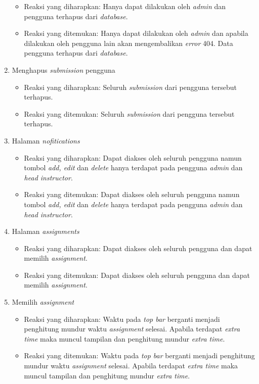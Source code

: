 \begin{enumerate}
	 \begin{itemize}
	 	\item Reaksi yang diharapkan: Hanya dapat dilakukan oleh \textit{admin} dan pengguna terhapus dari \textit{database}.
	 	\item Reaksi yang ditemukan: Hanya dapat dilakukan oleh \textit{admin} dan apabila dilakukan oleh pengguna lain akan mengembalikan \textit{error} 404. Data pengguna terhapus dari \textit{database}.
	 \end{itemize}
	 \item Menghapus \textit{submission} pengguna
	 \begin{itemize}
	 	\item Reaksi yang diharapkan: Seluruh \textit{submission} dari pengguna tersebut terhapus.
	 	\item Reaksi yang ditemukan: Seluruh \textit{submission} dari pengguna tersebut terhapus.
	 \end{itemize}
	 \item Halaman \textit{nofitications}
	 \begin{itemize}
	 	\item Reaksi yang diharapkan: Dapat diakses oleh seluruh pengguna namun tombol \textit{add, edit} dan \textit{delete} hanya terdapat pada pengguna \textit{admin} dan \textit{head instructor}.
	 	\item Reaksi yang ditemukan: Dapat diakses oleh seluruh pengguna namun tombol \textit{add, edit} dan \textit{delete} hanya terdapat pada pengguna \textit{admin} dan \textit{head instructor}.
	 \end{itemize}
	 \item Halaman \textit{assignments}
	 \begin{itemize}
	 	\item Reaksi yang diharapkan: Dapat diakses oleh seluruh pengguna dan dapat memilih \textit{assignment}.
	 	\item Reaksi yang ditemukan: Dapat diakses oleh seluruh pengguna dan dapat memilih \textit{assignment}.
	 \end{itemize}
	 \item Memilih \textit{assignment}
	 \begin{itemize}
	 	\item Reaksi yang diharapkan: Waktu pada \textit{top bar} berganti menjadi penghitung mundur waktu \textit{assignment} selesai. Apabila terdapat \textit{extra time} maka muncul tampilan dan penghitung mundur \textit{extra time}.
	 	\item Reaksi yang ditemukan: Waktu pada \textit{top bar} berganti menjadi penghitung mundur waktu \textit{assignment} selesai. Apabila terdapat \textit{extra time} maka muncul tampilan dan penghitung mundur \textit{extra time}.

\end{itemize}
\end{enumerate}
